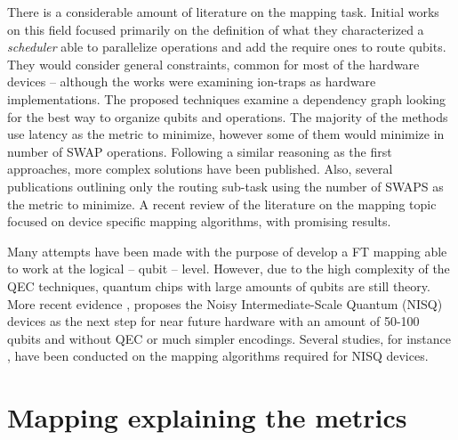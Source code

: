 There is a considerable amount of literature on the mapping task.
Initial works on this field \cite{Metodi_2006,Whitney_2007,Bahreini_2015} focused primarily on the definition of what they characterized a \emph{scheduler} able to parallelize operations and add the require ones to route qubits.
They would consider general constraints, common for most of the hardware devices -- although the works were examining ion-traps as hardware implementations.
The proposed techniques examine a dependency graph looking for the best way to organize qubits and operations.
The majority of the methods use latency as the metric to minimize, however some of them \cite{Farghadan_2017} would minimize in number of SWAP operations.
Following a similar reasoning as the first approaches, more complex solutions \cite{booth18:compar_integ_const_progr_tempor} have been published.
Also, several publications \cite{Lye_2015,Wille_2016} outlining only the routing sub-task using the number of SWAPS as the metric to minimize.
A recent review of the literature on the mapping topic \cite{zulehner17:effic_method_mappin_quant_circuit,Siraichi_2018,mckay18:qiskit_backen_specif_openq_openp_exper,Dueck_2018,Venturelli_2018} focused on device specific mapping algorithms, with promising results.

Many attempts have been made \cite{Dousti_2014,Heckey_2015,hwang18:hierar_system_mappin_large_scale,murphy18:contr,Lao_2018} with the purpose of develop a FT mapping able to work at the logical -- qubit -- level.
However, due to the high complexity of the QEC techniques, quantum chips with large amounts of qubits are still theory.
More recent evidence \cite{Preskill_2018}, proposes the Noisy Intermediate-Scale Quantum (NISQ) devices as the next step for near future hardware with an amount of 50-100 qubits and without QEC or much simpler encodings.
Several studies, for instance \cite{tannu18:case_variab_aware_polic_nisq,paler18:nisq,paler18:influen_initial_qubit_placem_durin}, have been conducted on the mapping algorithms required for NISQ devices.


\section*{Mapping explaining the metrics}
\label{sec:org38cf41a}
